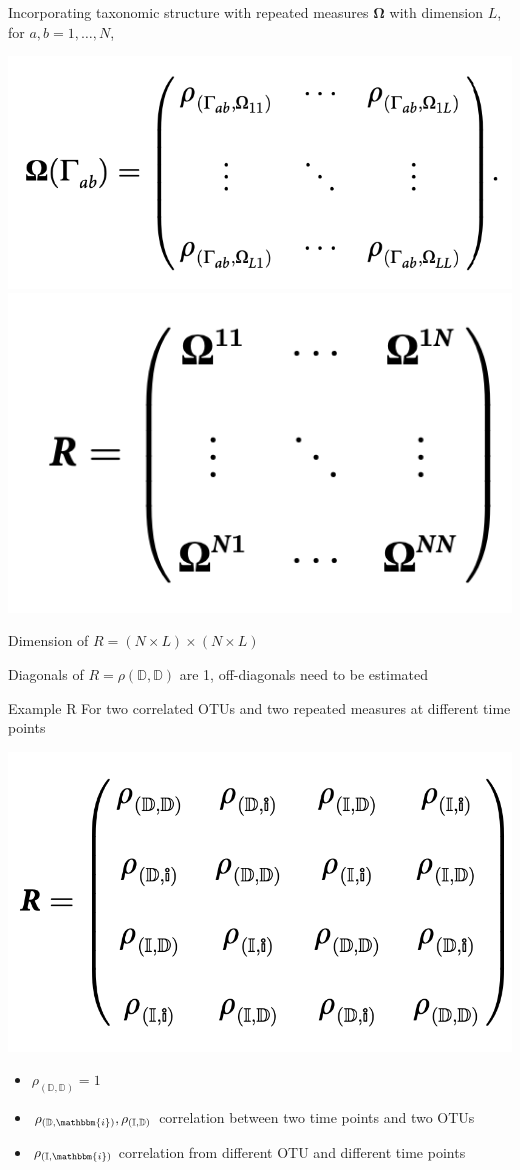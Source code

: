 \documentclass{beamer}
\begin{document}
\begin{frame}[t]{Incorporating taxonomic structure with repeated measures}
  $\boldsymbol\Omega$ with dimension $L$, for $a,b = 1, \ldots , N$,

\includegraphics[width = .5\textwidth]{omega_gamma.png} \includegraphics[width = .5\textwidth]{R.png}

Dimension of $R = (N \times L) \times (N \times L)$

Diagonals of $R = \rho(\mathbb{D},\mathbb{D})$ are 1, off-diagonals need to be estimated
\end{frame}


\begin{frame}[t]{Example R}
  For two correlated OTUs and two repeated measures at different time points

  \includegraphics[width = .5\textwidth]{r_ex.png}

  \begin{itemize}
    \item $\rho_{(\mathbb{D},\mathbb{D})} = 1$
    \item $\rho_{(\mathbb{D},\mathbbm{i})}, \rho_{(\mathbb{I},\mathbb{D})}$ correlation between two time points and two OTUs
    \item $\rho_{(\mathbb{I},\mathbbm{i})}$ correlation from different OTU and different time points
  \end{itemize}
\end{frame}
\end{document}
